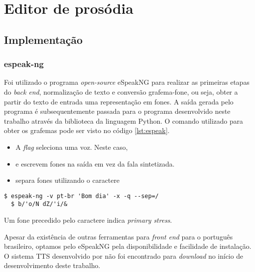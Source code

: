 
\simb[ms (milissegundos)]
\simb[Hz (Hertz)]

\chapter{Editor de prosódia}

\section{Implementação}
\subsection{espeak-ng}
Foi utilizado o programa \emph{open-source} eSpeakNG \cite{espeakng} para
realizar as primeiras etapas do \emph{back end}, normalização de texto e
conversão grafema-fone, ou seja, obter a partir do texto de entrada uma
representação em fones. A saída gerada pelo programa é subsequentemente passada
para o programa desenvolvido neste trabalho através da biblioteca
 da linguagem Python. O comando utilizado para obter os
grafemas pode ser visto no código
\ref{lst:espeak}.

\begin{itemize}
\item A \emph{flag}  seleciona uma voz. Neste caso, 
\item {} e  escrevem fones na saída em vez da fala sintetizada.
\item {} separa fones utilizando o caractere \code{/}
\end{itemize}

\begin{lstlisting}[caption=Utilização do programa espeak e saída correspondente,
  label=lst:espeak]
  $ espeak-ng -v pt-br 'Bom dia' -x -q --sep=/
  $ b/'o/N dZ/'i/&
\end{lstlisting}

Um fone precedido pelo caractere \code{\'} indica \emph{primary stress}.

Apesar da existência de outras ferramentas para \emph{front end} para o
português brasileiro, optamos pelo eSpeakNG pela disponibilidade e facilidade de
instalação. O sistema TTS desenvolvido por  não foi encontrado
para \emph{download} no início de desenvolvimento deste trabalho.


